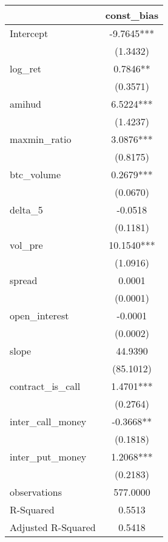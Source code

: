 \begin{tabular}{lc}
\hline
                   & const\_bias  \\
\midrule
\midrule
Intercept          & -9.7645***   \\
                   & (1.3432)     \\
log\_ret           & 0.7846**     \\
                   & (0.3571)     \\
amihud             & 6.5224***    \\
                   & (1.4237)     \\
maxmin\_ratio      & 3.0876***    \\
                   & (0.8175)     \\
btc\_volume        & 0.2679***    \\
                   & (0.0670)     \\
delta\_5           & -0.0518      \\
                   & (0.1181)     \\
vol\_pre           & 10.1540***   \\
                   & (1.0916)     \\
spread             & 0.0001       \\
                   & (0.0001)     \\
open\_interest     & -0.0001      \\
                   & (0.0002)     \\
slope              & 44.9390      \\
                   & (85.1012)    \\
contract\_is\_call & 1.4701***    \\
                   & (0.2764)     \\
inter\_call\_money & -0.3668**    \\
                   & (0.1818)     \\
inter\_put\_money  & 1.2068***    \\
                   & (0.2183)     \\
observations       & 577.0000     \\
R-Squared          & 0.5513       \\
Adjusted R-Squared & 0.5418       \\
\hline
\end{tabular}